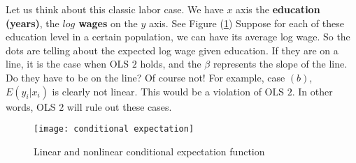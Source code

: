 \documentclass[11pt,a4paper]{amsart}
\theoremstyle{plain}
\theoremstyle{definition}
\begin{document}
 	Let us think about this classic labor case. 
 	We have $x$ axis the \textbf{education (years)}, the \textbf{$log$ wages} on the $y$ axis. See Figure (\ref{F:conditional expectation function})
 	Suppose for each of these education level in a certain population, we can have its average log wage. So the dots are telling about the expected log wage given education. If they are on a line, it is the case when OLS $2$ holds, and the $\beta$ represents the slope of the line. Do they have to be on the line? Of course not! For example, case $(b)$, $E(y_{i} | x_{i})$ is clearly not linear. This would be a violation of OLS $2$. In other words, OLS $2$ will rule out these cases. 
 		\begin{figure}[hbt]
 		{\centering \texttt{[image: conditional expectation]}}
 		\caption{Linear and nonlinear conditional expectation function}\label{F:conditional expectation function}
 		\end{figure}
 	
\end{document}
